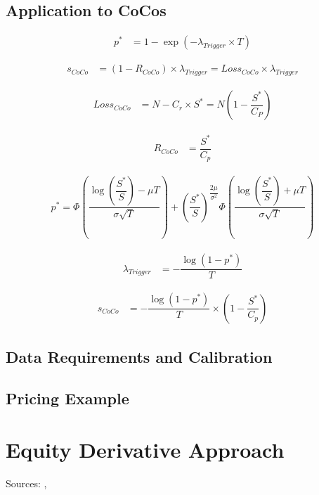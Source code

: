 \subsection{Application to CoCos}

\begin{align}
    p^* &= 1 - \exp\left(- \lambda_{Trigger} \times T\right)
\end{align}

\begin{align}
    s_{CoCo} &= \left(1 - R_{CoCo}\right) \times \lambda_{Trigger} = {Loss}_{CoCo} \times \lambda_{Trigger}
\end{align}

\begin{align}
    {Loss}_{CoCo} &= N - C_r \times S^* = N \left(1 - \dfrac{S^*}{C_P} \right)
\end{align}

\begin{align}
    R_{CoCo} &= \dfrac{S^*}{C_p}
\end{align}

\begin{align}
    p^* = \Phi\left( \dfrac{\log \left(\dfrac{S^*}{S}\right) - \mu T}{\sigma \sqrt{T}}\right) + \left(\dfrac{S^*}{S}\right)^{\dfrac{2 \mu}{\sigma^2}} \Phi\left( \dfrac{\log \left(\dfrac{S^*}{S}\right) + \mu T}{\sigma \sqrt{T}}\right)
\end{align}

\begin{align}
\lambda_{Trigger} &= - \dfrac{\log \left(1 - p^* \right)}{T}
\end{align}

\begin{align}
s_{CoCo} &= -\dfrac{\log \left(1 - p^*\right)}{T} \times \left( 1 - \dfrac{S^*}{C_p} \right)
\end{align}

\subsection{Data Requirements and Calibration}

\subsection{Pricing Example}

\section{Equity Derivative Approach}
Sources: \cite{erismann2015pricing}, \cite{de2011pricing}

